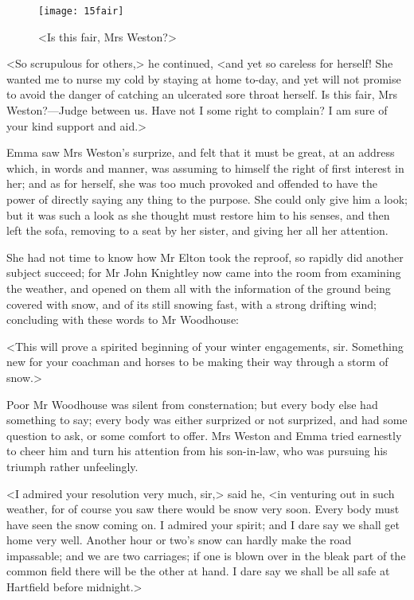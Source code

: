 \begin{figure}[tbph]
\centering
\texttt{[image: 15fair]}
\caption{<Is this fair, Mrs Weston?>}
\end{figure}

<So scrupulous for others,> he continued, <and yet so careless for herself! She wanted me to nurse my cold by staying at home to-day, and yet will not promise to avoid the danger of catching an ulcerated sore throat herself. Is this fair, Mrs Weston?—Judge between us. Have not I some right to complain? I am sure of your kind support and aid.>

Emma saw Mrs Weston's surprize, and felt that it must be great, at an address which, in words and manner, was assuming to himself the right of first interest in her; and as for herself, she was too much provoked and offended to have the power of directly saying any thing to the purpose. She could only give him a look; but it was such a look as she thought must restore him to his senses, and then left the sofa, removing to a seat by her sister, and giving her all her attention.

She had not time to know how Mr Elton took the reproof, so rapidly did another subject succeed; for Mr John Knightley now came into the room from examining the weather, and opened on them all with the information of the ground being covered with snow, and of its still snowing fast, with a strong drifting wind; concluding with these words to Mr Woodhouse:

<This will prove a spirited beginning of your winter engagements, sir. Something new for your coachman and horses to be making their way through a storm of snow.>

Poor Mr Woodhouse was silent from consternation; but every body else had something to say; every body was either surprized or not surprized, and had some question to ask, or some comfort to offer. Mrs Weston and Emma tried earnestly to cheer him and turn his attention from his son-in-law, who was pursuing his triumph rather unfeelingly.

<I admired your resolution very much, sir,> said he, <in venturing out in such weather, for of course you saw there would be snow very soon. Every body must have seen the snow coming on. I admired your spirit; and I dare say we shall get home very well. Another hour or two's snow can hardly make the road impassable; and we are two carriages; if one is blown over in the bleak part of the common field there will be the other at hand. I dare say we shall be all safe at Hartfield before midnight.>

